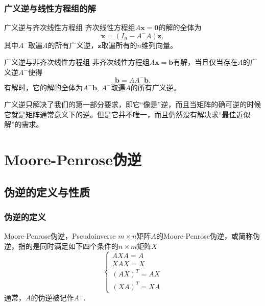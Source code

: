 \begin{frame}
\frametitle{广义逆与线性方程组的解}

\begin{block}{广义逆与齐次线性方程组}
齐次线性方程组$A\mathbf{x} = \mathbf{0}$的解的全体为
\[\mathbf{x} = (I_n - A^-A)\mathbf{z},\]
其中$A^-$取遍$A$的所有广义逆，$\mathbf{z}$取遍所有的$n$维列向量。
\end{block}

\pause

\begin{block}{广义逆与非齐次线性方程组}
非齐次线性方程组$A\mathbf{x} = \mathbf{b}$有解，当且仅当存在$A$的广义逆$A^-$使得
\[\mathbf{b} = A A^- \mathbf{b}.\]
有解时，它的解的全体为$A^-\mathbf{b}$, $A^-$取遍$A$的所有广义逆。
\end{block}

\end{frame}


\begin{frame}

{
\large
广义逆只解决了我们的第一部分要求，即它``像是''逆，而且当矩阵的确可逆的时候它就是矩阵通常意义下的逆。但是它并不唯一，而且仍然没有解决求``最佳近似解''的需求。
}

\end{frame}


\section{Moore-Penrose伪逆}


\subsection{伪逆的定义与性质}


\begin{frame}
\frametitle{伪逆的定义}

\begin{block}{Moore-Penrose伪逆，Pseudoinverse}
$m\times n$矩阵$A$的Moore-Penrose伪逆，或简称伪逆，指的是同时满足如下四个条件的$n\times m$矩阵$X$
\[
\begin{cases}
AXA = A \\
XAX = X \\
(AX)^T = AX \\
(XA)^T = XA
\end{cases}
\]
通常，$A$的伪逆被记作$A^+$.
\end{block}

\end{frame}

